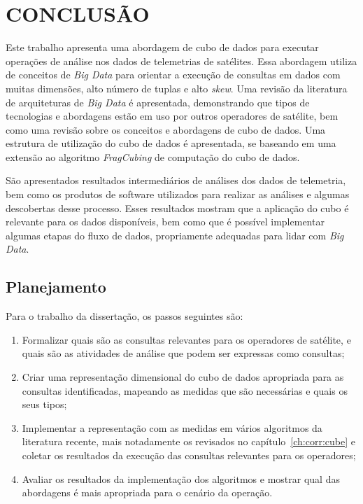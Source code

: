 
\chapter{CONCLUSÃO}\label{ch:concl}

Este trabalho apresenta uma abordagem de cubo de dados para executar operações de análise nos dados de telemetrias de satélites.
Essa abordagem utiliza de conceitos de \textit{Big Data} para orientar a execução de consultas em dados com muitas dimensões, alto número de tuplas e alto \textit{skew}.
Uma revisão da literatura de arquiteturas de \textit{Big Data} é apresentada, demonstrando que tipos de tecnologias e abordagens estão em uso por outros operadores de satélite, bem como uma revisão sobre os conceitos e abordagens de cubo de dados.
Uma estrutura de utilização do cubo de dados é apresentada, se baseando em uma extensão ao algoritmo \textit{FragCubing} de computação do cubo de dados.

São apresentados resultados intermediários de análises dos dados de telemetria, bem como os produtos de software utilizados para realizar as análises e algumas descobertas desse processo.
Esses resultados mostram que a aplicação do cubo é relevante para os dados disponíveis, bem como que é possível implementar algumas etapas do fluxo de dados, propriamente adequadas para lidar com \textit{Big Data}.

\section{Planejamento}\label{ch:concl:planning}

Para o trabalho da dissertação, os passos seguintes são:

\begin{enumerate}
\item Formalizar quais são as consultas relevantes para os operadores de satélite, e quais são as atividades de análise que podem ser expressas como consultas;
\item Criar uma representação dimensional do cubo de dados apropriada para as consultas identificadas, mapeando as medidas que são necessárias e quais os seus tipos;
\item Implementar a representação com as medidas em vários algoritmos da literatura recente, mais notadamente os revisados no capítulo~\ref{ch:corr:cube} e coletar os resultados da execução das consultas relevantes para os operadores;
\item Avaliar os resultados da implementação dos algoritmos e mostrar qual das abordagens é mais apropriada para o cenário da operação.
\end{enumerate}

